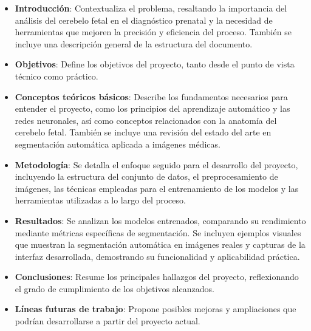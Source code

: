 \begin{itemize}
    \item \textbf{Introducción}: Contextualiza el problema, resaltando la importancia del análisis del cerebelo fetal en el diagnóstico prenatal y la necesidad de herramientas que mejoren la precisión y eficiencia del proceso. También se incluye una descripción general de la estructura del documento.
    \item \textbf{Objetivos}: Define los objetivos del proyecto, tanto desde el punto de vista técnico como práctico.
    \item \textbf{Conceptos teóricos básicos}: Describe los fundamentos necesarios para entender el proyecto, como los principios del aprendizaje automático y las redes neuronales, así como conceptos relacionados con la anatomía del cerebelo fetal. También se incluye una revisión del estado del arte en segmentación automática aplicada a imágenes médicas.
    \item \textbf{Metodología}: Se detalla el enfoque seguido para el desarrollo del proyecto, incluyendo la estructura del conjunto de datos, el preprocesamiento de imágenes, las técnicas empleadas para el entrenamiento de los modelos y las herramientas utilizadas a lo largo del proceso.
    \item \textbf{Resultados}: Se analizan los modelos entrenados, comparando su rendimiento mediante métricas específicas de segmentación. Se incluyen ejemplos visuales que muestran la segmentación automática en imágenes reales y capturas de la interfaz desarrollada, demostrando su funcionalidad y aplicabilidad práctica.
    \item \textbf{Conclusiones}: Resume los principales hallazgos del proyecto, reflexionando el grado de cumplimiento de los objetivos alcanzados.
    \item \textbf{Líneas futuras de trabajo}: Propone posibles mejoras y ampliaciones que podrían desarrollarse a partir del proyecto actual.
\end{itemize}


